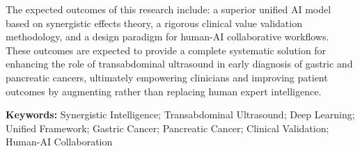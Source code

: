 The expected outcomes of this research include: a superior unified AI model based on synergistic effects theory, a rigorous clinical value validation methodology, and a design paradigm for human-AI collaborative workflows. These outcomes are expected to provide a complete systematic solution for enhancing the role of transabdominal ultrasound in early diagnosis of gastric and pancreatic cancers, ultimately empowering clinicians and improving patient outcomes by augmenting rather than replacing human expert intelligence.

\textbf{Keywords:} Synergistic Intelligence; Transabdominal Ultrasound; Deep Learning; Unified Framework; Gastric Cancer; Pancreatic Cancer; Clinical Validation; Human-AI Collaboration